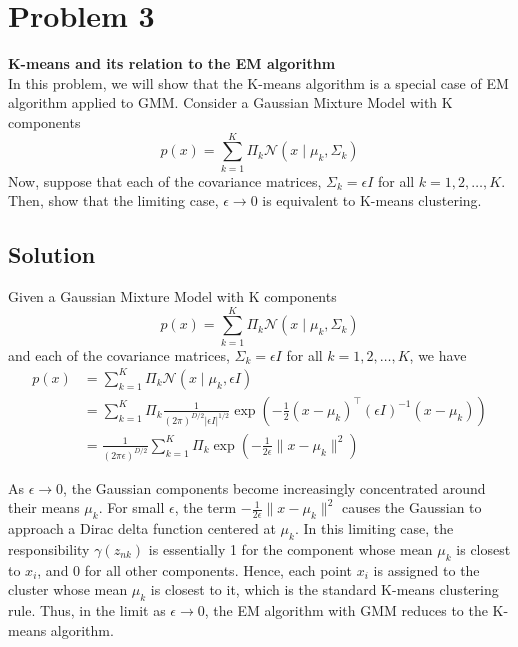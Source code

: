\section*{Problem 3}

\textbf{K-means and its relation to the EM algorithm}\\
In this problem, we will show that the K-means algorithm is a special case of EM algorithm applied to GMM.\@
Consider a Gaussian Mixture Model with K components
\[
    p(x)=\sum_{k=1}^{K} \Pi_{k} \mathcal{N}\left(x \mid \mu_{k}, \Sigma_{k}\right)
\]
Now, suppose that each of the covariance matrices, \( \Sigma_{k}=\epsilon I \) for all \( k=1,2, \ldots, K \).
Then, show that the limiting case, \( \epsilon \rightarrow 0 \) is equivalent to K-means clustering.

\subsection*{Solution}

Given a Gaussian Mixture Model with K components
\begin{equation*}
    p(x)=\sum_{k=1}^{K} \Pi_{k} \mathcal{N}\left(x \mid \mu_{k}, \Sigma_{k}\right)
\end{equation*}
and each of the covariance matrices, \( \Sigma_{k}=\epsilon I \) for all \( k=1,2, \ldots, K \), we have
\begin{align*}
    p(x)
     & =
    \sum_{k=1}^{K} \Pi_{k} \mathcal{N}\left(x \mid \mu_{k}, \epsilon I\right)
    \\ & =
    \sum_{k=1}^{K} \Pi_{k} \frac{1}{(2\pi)^{D/2} |\epsilon I|^{1/2}} \exp\left( -\frac{1}{2} (x - \mu_k)^\top (\epsilon I)^{-1} (x - \mu_k) \right)
    \\ & =
    \frac{1}{(2\pi \epsilon)^{D/2}} \sum_{k=1}^{K} \Pi_{k} \exp\left( -\frac{1}{2\epsilon} \|x - \mu_k\|^2 \right)
\end{align*}

As \( \epsilon \to 0 \), the Gaussian components become increasingly concentrated around their means \( \mu_k \).
For small \( \epsilon \), the term \( -\frac{1}{2\epsilon} \|x - \mu_k\|^2 \) causes the Gaussian to approach a Dirac delta function centered at \( \mu_k \).
In this limiting case, the responsibility \( \gamma\left(z_{n k}\right) \) is essentially 1 for the component whose mean \( \mu_k \) is closest to \( x_i \), and 0 for all other components.
Hence, each point \( x_i \) is assigned to the cluster whose mean \( \mu_k \) is closest to it, which is the standard K-means clustering rule.
Thus, in the limit as \( \epsilon \to 0 \), the EM algorithm with GMM reduces to the K-means algorithm.
